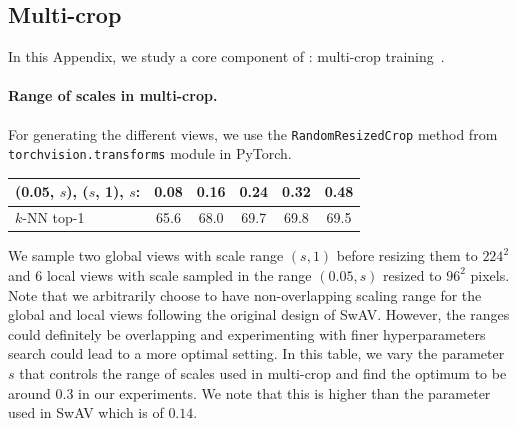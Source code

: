 \subsection{Multi-crop}
\label{ap:mc}
In this Appendix, we study a core component of \OURS: multi-crop training~\cite{caron2020unsupervised}.


\paragraph{Range of scales in multi-crop.}
For generating the different views, we use the \texttt{RandomResizedCrop} method from \texttt{torchvision.transforms} module in PyTorch.
\begin{table}[h!]
\vspace{-0.8em}
\centering
  \begin{tabular}{@{}l c c c c c@{}}
	  (0.05, $s$), ($s$, 1), $s$: & 0.08 & 0.16 & 0.24 & 0.32 & 0.48 \\
    \midrule
	  $k$-NN top-1 & 65.6 & 68.0 & 69.7 & 69.8 & 69.5 \\
  \end{tabular}
\vspace{-0.8em}
\end{table}
We sample two global views with scale range $(s, 1)$ before resizing them to $224^2$ and $6$ local views with scale sampled in the range $(0.05, s)$ resized to $96^2$ pixels.
Note that we arbitrarily choose to have non-overlapping scaling range for the global and local views following the original design of SwAV.
However, the ranges could definitely be overlapping and experimenting with finer hyperparameters search could lead to a more optimal setting.
In this table, we vary the parameter $s$ that controls the range of scales used in multi-crop and find the optimum to be around $0.3$ in our experiments.
We note that this is higher than the parameter used in SwAV which is of $0.14$.

